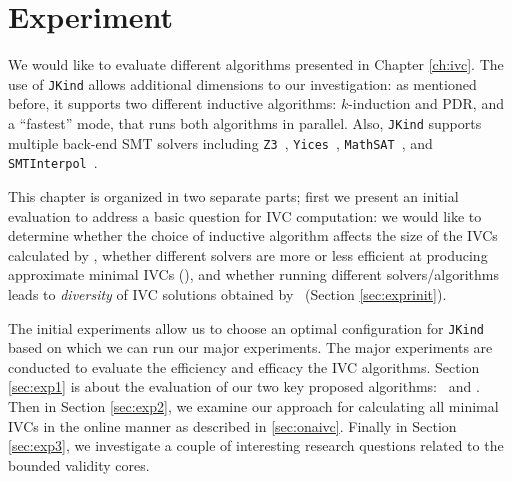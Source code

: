 \chapter{Experiment}
\label{ch:experiment}

\newcommand{\takeaway}[1]{
\vspace{12pt}
\noindent\fbox{\parbox{\textwidth}{#1}}
\vspace{6pt}
}
We would like to evaluate different algorithms presented in Chapter \ref{ch:ivc}. 
 The use of \texttt{JKind} allows additional dimensions to our investigation: as mentioned before, it supports two different inductive algorithms: $k$-induction and PDR, and a ``fastest'' mode, that runs both algorithms in parallel.  Also, \texttt{JKind} supports multiple back-end SMT solvers including \texttt{Z3}~\cite{DeMoura08:z3}, \texttt{Yices}~\cite{Dutertre06:yices}, \texttt{MathSAT}~\cite{Cimatti2013:MathSAT}, and \texttt{SMTInterpol}~\cite{Christ2012:SMTInterpol}.
 
 This chapter is organized in two separate parts; first we present an initial evaluation to address a basic question for IVC computation: we would like to determine whether the choice of inductive algorithm affects the size of the IVCs calculated by \ucalg , whether different solvers are more or less efficient at producing approximate minimal IVCs (\ucalg), and whether running different solvers/algorithms leads to {\em diversity} of IVC solutions obtained by \ucalg\ (Section \ref{sec:exprinit}).

The initial experiments allow us to choose an optimal configuration for \texttt{JKind} based on which we can run our major experiments. The major experiments are conducted to evaluate the efficiency and efficacy the IVC algorithms. Section \ref{sec:exp1} is about the evaluation of our two key proposed algorithms: \ucalg\ and \aivcalg . Then in Section \ref{sec:exp2}, we examine our approach for calculating all minimal IVCs in the online manner as described in \ref{sec:onaivc}. Finally in Section \ref{sec:exp3}, we investigate a couple of interesting research questions related to the bounded validity cores.

